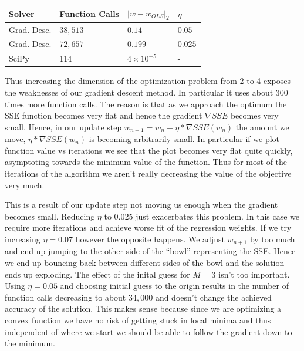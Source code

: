 \documentclass[10pt]{article}
\begin{document}
\begin{tabular}{|l|l|l|l|}
\hline
Solver & Function Calls & $|w - w_{OLS}|_2$ & $\eta$ \\ \hline
Grad. Desc. & $38,513$ & $0.14$ & $0.05$ \\ \hline
Grad. Desc. & $72, 657$ & $0.199$ & $0.025$ \\ \hline
SciPy & 114 & $4\times 10^{-5}$ & - \\ \hline
\end{tabular}
%
%

Thus increasing the dimension of the optimization problem from 2 to 4 exposes the weaknesses of our gradient descent method. In particular it uses about $300$ times more function calls. The reason is that as we approach the optimum the SSE function becomes very flat and hence the gradient $\nabla SSE$ becomes very small. Hence, in our update step $w_{n+1} = w_n - \eta*\nabla SSE(w_n)$ the amount we move, $\eta*\nabla SSE(w_n)$ is becoming arbitrarily small. In particular if we plot function value vs iterations we see that the plot becomes very flat quite quickly, asymptoting towards the minimum value of the function. Thus for most of the iterations of the algorithm we aren't really decreasing the value of the objective very much. 

%
This is a result of our update step not moving us enough when the gradient becomes small. Reducing $\eta$ to $0.025$ just exacerbates this problem. In this case we require more iterations and achieve worse fit of the regression weights. If we try increasing $\eta = 0.07$ however the opposite happens. We adjust $w_{n+1}$ by too much and end up jumping to the other side of the ``bowl'' representing the SSE. Hence we end up bouncing back between different sides of the bowl and the solution ends up exploding. The effect of the inital guess for $M = 3$ isn't too important. Using $\eta = 0.05$ and choosing initial guess to the origin results in the number of function calls decreasing to about $34,000$ and doesn't change the achieved accuracy of the solution. This makes sense because since we are optimizing a convex function we have no risk of getting stuck in local minima and thus independent of where we start we should be able to follow the gradient down to the minimum.
\end{document}

